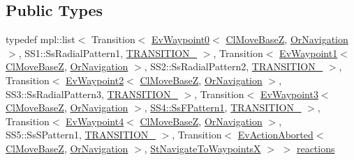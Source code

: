 \subsection*{Public Types}
\begin{DoxyCompactItemize}
\item 
typedef mpl\+::list$<$ Transition$<$ \hyperlink{structcl__move__base__z_1_1EvWaypoint0}{Ev\+Waypoint0}$<$ \hyperlink{classcl__move__base__z_1_1ClMoveBaseZ}{Cl\+Move\+BaseZ}, \hyperlink{classsm__dance__bot__2_1_1OrNavigation}{Or\+Navigation} $>$, S\+S1\+::\+Ss\+Radial\+Pattern1, \hyperlink{structsm__dance__bot__2_1_1StNavigateToWaypointsX_1_1TRANSITION__1}{T\+R\+A\+N\+S\+I\+T\+I\+O\+N\+\_} $>$, Transition$<$ \hyperlink{structcl__move__base__z_1_1EvWaypoint1}{Ev\+Waypoint1}$<$ \hyperlink{classcl__move__base__z_1_1ClMoveBaseZ}{Cl\+Move\+BaseZ}, \hyperlink{classsm__dance__bot__2_1_1OrNavigation}{Or\+Navigation} $>$, S\+S2\+::\+Ss\+Radial\+Pattern2, \hyperlink{structsm__dance__bot__2_1_1StNavigateToWaypointsX_1_1TRANSITION__2}{T\+R\+A\+N\+S\+I\+T\+I\+O\+N\+\_} $>$, Transition$<$ \hyperlink{structcl__move__base__z_1_1EvWaypoint2}{Ev\+Waypoint2}$<$ \hyperlink{classcl__move__base__z_1_1ClMoveBaseZ}{Cl\+Move\+BaseZ}, \hyperlink{classsm__dance__bot__2_1_1OrNavigation}{Or\+Navigation} $>$, S\+S3\+::\+Ss\+Radial\+Pattern3, \hyperlink{structsm__dance__bot__2_1_1StNavigateToWaypointsX_1_1TRANSITION__3}{T\+R\+A\+N\+S\+I\+T\+I\+O\+N\+\_} $>$, Transition$<$ \hyperlink{structcl__move__base__z_1_1EvWaypoint3}{Ev\+Waypoint3}$<$ \hyperlink{classcl__move__base__z_1_1ClMoveBaseZ}{Cl\+Move\+BaseZ}, \hyperlink{classsm__dance__bot__2_1_1OrNavigation}{Or\+Navigation} $>$, \hyperlink{structsm__dance__bot__2_1_1SS4_1_1SsFPattern1}{S\+S4\+::\+Ss\+F\+Pattern1}, \hyperlink{structsm__dance__bot__2_1_1StNavigateToWaypointsX_1_1TRANSITION__4}{T\+R\+A\+N\+S\+I\+T\+I\+O\+N\+\_} $>$, Transition$<$ \hyperlink{structcl__move__base__z_1_1EvWaypoint4}{Ev\+Waypoint4}$<$ \hyperlink{classcl__move__base__z_1_1ClMoveBaseZ}{Cl\+Move\+BaseZ}, \hyperlink{classsm__dance__bot__2_1_1OrNavigation}{Or\+Navigation} $>$, S\+S5\+::\+Ss\+S\+Pattern1, \hyperlink{structsm__dance__bot__2_1_1StNavigateToWaypointsX_1_1TRANSITION__5}{T\+R\+A\+N\+S\+I\+T\+I\+O\+N\+\_} $>$, Transition$<$ \hyperlink{structsmacc_1_1default__events_1_1EvActionAborted}{Ev\+Action\+Aborted}$<$ \hyperlink{classcl__move__base__z_1_1ClMoveBaseZ}{Cl\+Move\+BaseZ}, \hyperlink{classsm__dance__bot__2_1_1OrNavigation}{Or\+Navigation} $>$, \hyperlink{structsm__dance__bot__2_1_1StNavigateToWaypointsX}{St\+Navigate\+To\+WaypointsX} $>$ $>$ \hyperlink{structsm__dance__bot__2_1_1StNavigateToWaypointsX_aacde4993376bc15f63703c3d676f2114}{reactions}
\end{DoxyCompactItemize}
